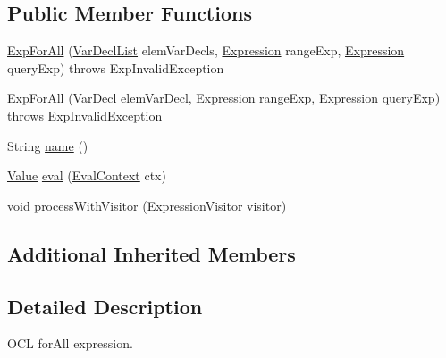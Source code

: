 \subsection*{Public Member Functions}
\begin{DoxyCompactItemize}
\item 
\hyperlink{classorg_1_1tzi_1_1use_1_1uml_1_1ocl_1_1expr_1_1_exp_for_all_abe09205aaaead10e05965f776fa1bcd5}{Exp\-For\-All} (\hyperlink{classorg_1_1tzi_1_1use_1_1uml_1_1ocl_1_1expr_1_1_var_decl_list}{Var\-Decl\-List} elem\-Var\-Decls, \hyperlink{classorg_1_1tzi_1_1use_1_1uml_1_1ocl_1_1expr_1_1_expression}{Expression} range\-Exp, \hyperlink{classorg_1_1tzi_1_1use_1_1uml_1_1ocl_1_1expr_1_1_expression}{Expression} query\-Exp)  throws Exp\-Invalid\-Exception     
\item 
\hyperlink{classorg_1_1tzi_1_1use_1_1uml_1_1ocl_1_1expr_1_1_exp_for_all_a35fc94df04660aa3e1f677938805b019}{Exp\-For\-All} (\hyperlink{classorg_1_1tzi_1_1use_1_1uml_1_1ocl_1_1expr_1_1_var_decl}{Var\-Decl} elem\-Var\-Decl, \hyperlink{classorg_1_1tzi_1_1use_1_1uml_1_1ocl_1_1expr_1_1_expression}{Expression} range\-Exp, \hyperlink{classorg_1_1tzi_1_1use_1_1uml_1_1ocl_1_1expr_1_1_expression}{Expression} query\-Exp)  throws Exp\-Invalid\-Exception     
\item 
String \hyperlink{classorg_1_1tzi_1_1use_1_1uml_1_1ocl_1_1expr_1_1_exp_for_all_a4189da1cddb36f5b54fa308124f9abef}{name} ()
\item 
\hyperlink{classorg_1_1tzi_1_1use_1_1uml_1_1ocl_1_1value_1_1_value}{Value} \hyperlink{classorg_1_1tzi_1_1use_1_1uml_1_1ocl_1_1expr_1_1_exp_for_all_a6b2c6f173f3c56bbae9a7fefd0b0a3c2}{eval} (\hyperlink{classorg_1_1tzi_1_1use_1_1uml_1_1ocl_1_1expr_1_1_eval_context}{Eval\-Context} ctx)
\item 
void \hyperlink{classorg_1_1tzi_1_1use_1_1uml_1_1ocl_1_1expr_1_1_exp_for_all_a215dc3122860e24f9e5b23ac7a50b69b}{process\-With\-Visitor} (\hyperlink{interfaceorg_1_1tzi_1_1use_1_1uml_1_1ocl_1_1expr_1_1_expression_visitor}{Expression\-Visitor} visitor)
\end{DoxyCompactItemize}
\subsection*{Additional Inherited Members}


\subsection{Detailed Description}
O\-C\-L for\-All expression.

